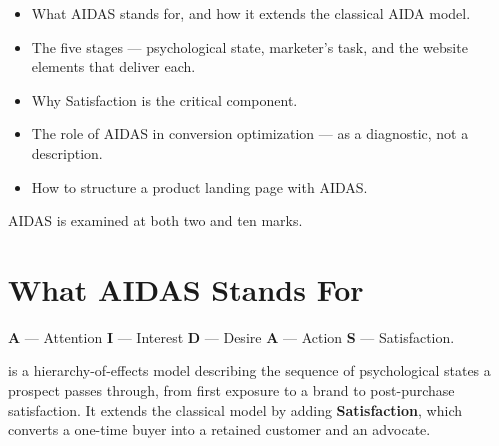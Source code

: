 \documentclass{MMTextbook}
\begin{document}
\begin{learningoutcomes}
\begin{itemize}
\item What AIDAS stands for, and how it extends the classical AIDA model.
\item The five stages --- psychological state, marketer's task, and the website
      elements that deliver each.
\item Why Satisfaction is the critical component.
\item The role of AIDAS in conversion optimization --- as a diagnostic, not a
      description.
\item How to structure a product landing page with AIDAS.
\end{itemize}
\end{learningoutcomes}

\begin{keybox}
AIDAS is examined at both two and ten marks.
\end{keybox}

\section{What AIDAS Stands For}

\begin{exambox}
\textbf{A} --- Attention \quad\textbullet\quad \textbf{I} --- Interest
\quad\textbullet\quad \textbf{D} --- Desire \quad\textbullet\quad \textbf{A} ---
Action \quad\textbullet\quad \textbf{S} --- Satisfaction.
\end{exambox}

 is a hierarchy-of-effects model describing the sequence
of psychological states a prospect passes through, from first exposure to a brand
to post-purchase satisfaction. It extends the classical 
model by adding \textbf{Satisfaction}, which converts a one-time buyer into a
retained customer and an advocate.
\end{document}
